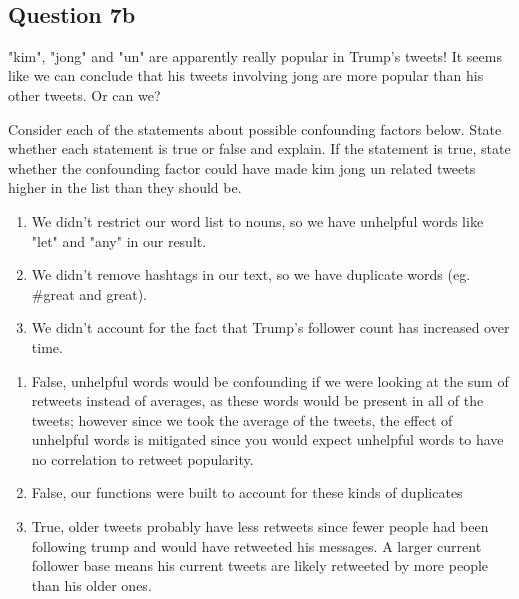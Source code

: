 \documentclass[11pt]{article}
\providecommand{\tightlist}{%
      \setlength{\itemsep}{0pt}\setlength{\parskip}{0pt}}
\begin{document}
    \begin{center}
    \end{center}
    { \hspace*{\fill} \\}
    
    \subsection{Question 7b}\label{question-7b}

"kim", "jong" and "un" are apparently really popular in Trump's tweets!
It seems like we can conclude that his tweets involving jong are more
popular than his other tweets. Or can we?

Consider each of the statements about possible confounding factors
below. State whether each statement is true or false and explain. If the
statement is true, state whether the confounding factor could have made
kim jong un related tweets higher in the list than they should be.

\begin{enumerate}
\def\labelenumi{\arabic{enumi}.}
\tightlist
\item
  We didn't restrict our word list to nouns, so we have unhelpful words
  like "let" and "any" in our result.
\item
  We didn't remove hashtags in our text, so we have duplicate words (eg.
  \#great and great).
\item
  We didn't account for the fact that Trump's follower count has
  increased over time.
\end{enumerate}

    \begin{enumerate}
\def\labelenumi{\arabic{enumi})}
\item
  False, unhelpful words would be confounding if we were looking at the
  sum of retweets instead of averages, as these words would be present
  in all of the tweets; however since we took the average of the tweets,
  the effect of unhelpful words is mitigated since you would expect
  unhelpful words to have no correlation to retweet popularity.
\item
  False, our functions were built to account for these kinds of
  duplicates
\item
  True, older tweets probably have less retweets since fewer people had
  been following trump and would have retweeted his messages. A larger
  current follower base means his current tweets are likely retweeted by
  more people than his older ones.
\end{enumerate}
\end{document}
